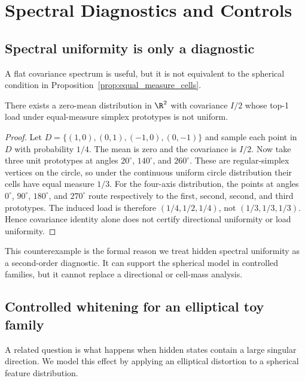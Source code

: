 \section{Spectral Diagnostics and Controls}

\subsection{Spectral uniformity is only a diagnostic}

A flat covariance spectrum is useful, but it is not equivalent to the spherical
condition in Proposition~\ref{prop:equal_measure_cells}.

\begin{proposition}
\label{prop:isotropic_not_directional}
There exists a zero-mean distribution in $\R^2$ with covariance $I/2$ whose
top-1 load under equal-measure simplex prototypes is not uniform.
\end{proposition}

\begin{proof}
Let $D=\{(1,0),(0,1),(-1,0),(0,-1)\}$ and sample each point in $D$ with
probability $1/4$. The mean is zero and the covariance is $I/2$. Now take three
unit prototypes at angles $20^\circ$, $140^\circ$, and $260^\circ$. These are
regular-simplex vertices on the circle, so under the continuous uniform circle
distribution their cells have equal measure $1/3$. For the four-axis
distribution, the points at angles $0^\circ$, $90^\circ$, $180^\circ$, and
$270^\circ$ route respectively to the first, second, second, and third
prototypes. The induced load is therefore $(1/4,1/2,1/4)$, not
$(1/3,1/3,1/3)$. Hence covariance identity alone does not certify directional
uniformity or load uniformity.
\end{proof}

This counterexample is the formal reason we treat hidden spectral uniformity as
a second-order diagnostic. It can support the spherical model in controlled
families, but it cannot replace a directional or cell-mass analysis.

\subsection{Controlled whitening for an elliptical toy family}

A related question is what happens when hidden states contain a large singular
direction. We model this effect by applying an elliptical distortion to a
spherical feature distribution.

